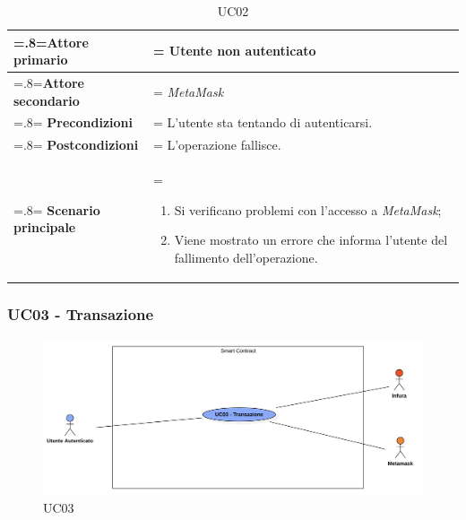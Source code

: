                 \begin{table}[H]
                    \centering
                    \renewcommand{\arraystretch}{1.8}
                    \renewcommand\tabularxcolumn[1]{m{#1}}
                    \begin{tabularx}{0.9\textwidth} {
                        >{\hsize=.8\hsize\linewidth=\hsize}X
                        >{\hsize=1.2\hsize\linewidth=\hsize}X}
                        \hline
                        \textbf{Attore primario} & Utente non autenticato \\
                        \hline
                        \textbf{Attore secondario} & \textit{MetaMask} \\
                        \hline
                        \textbf{Precondizioni} & L'utente sta tentando di autenticarsi. \\
                        \hline
                        \textbf{Postcondizioni} & L'operazione fallisce. \\
                        \hline
                        \textbf{Scenario principale} &
                            \begin{enumerate}
                                \item Si verificano problemi con l'accesso a \textit{MetaMask};
                                \item Viene mostrato un errore che informa l'utente del fallimento dell'operazione.
                            \end{enumerate} \\
                        \hline
                    \end{tabularx}
                    \caption{UC02}
                \end{table}

            \subsubsection{UC03 - Transazione}
            \label{UC03}
                \begin{figure}[H]
                    \centering
                    \includegraphics[scale=0.4]{src/img/UC03.png}
                    \caption{UC03}
                \end{figure}
    
